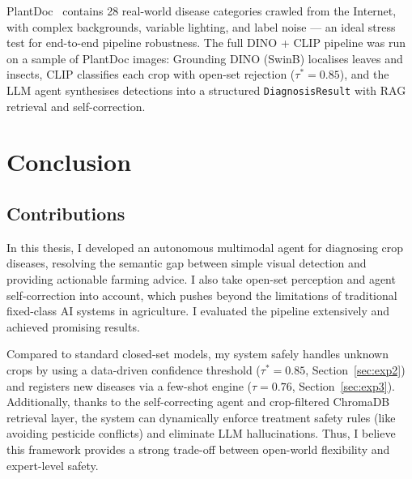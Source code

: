 PlantDoc~\cite{DBLP:journals/corr/abs-1911-10317} contains 28 real-world disease categories
crawled from the Internet, with complex backgrounds, variable lighting, and
label noise --- an ideal stress test for end-to-end pipeline robustness.
The full DINO + CLIP pipeline was run on a sample of PlantDoc images:
Grounding DINO (SwinB) localises leaves and insects, CLIP classifies each
crop with open-set rejection ($\tau^* = 0.85$), and the LLM agent synthesises
detections into a structured \texttt{DiagnosisResult} with RAG retrieval and
self-correction.



\chapter{Conclusion}
\label{sec:conclusion}

\section{Contributions}

In this thesis, I developed an autonomous multimodal agent for diagnosing crop diseases, resolving the semantic gap between simple visual detection and providing actionable farming advice. I also take open-set perception and agent self-correction into account, which pushes beyond the limitations of traditional fixed-class AI systems in agriculture. I evaluated the pipeline extensively and achieved promising results. 

Compared to standard closed-set models, my system safely handles unknown crops by using a data-driven confidence threshold ($\tau^* = 0.85$, Section~\ref{sec:exp2}) and registers new diseases via a few-shot engine ($\tau = 0.76$, Section~\ref{sec:exp3}). Additionally, thanks to the self-correcting agent and crop-filtered ChromaDB retrieval layer, the system can dynamically enforce treatment safety rules (like avoiding pesticide conflicts) and eliminate LLM hallucinations. Thus, I believe this framework provides a strong trade-off between open-world flexibility and expert-level safety.

